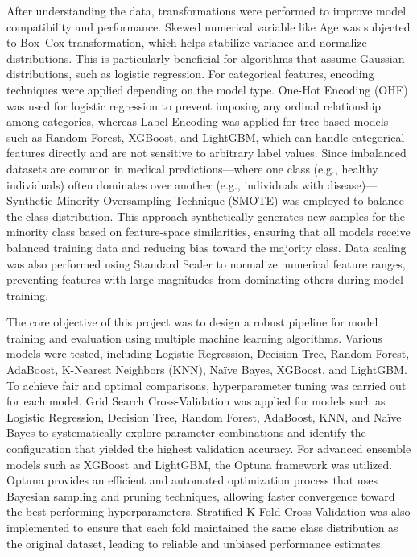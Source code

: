 After understanding the data, transformations were performed to improve model compatibility and performance.
Skewed numerical variable like Age was subjected to Box–Cox transformation, which helps stabilize variance and normalize distributions.
This is particularly beneficial for algorithms that assume Gaussian distributions, such as logistic regression.
For categorical features, encoding techniques were applied depending on the model type.
One-Hot Encoding (OHE) was used for logistic regression to prevent imposing any ordinal relationship among categories, whereas Label Encoding was applied for tree-based models such as Random Forest, XGBoost, and LightGBM, which can handle categorical features directly and are not sensitive to arbitrary label values.
Since imbalanced datasets are common in medical predictions—where one class (e.g., healthy individuals) often dominates over another (e.g., individuals with disease)— Synthetic Minority Oversampling Technique (SMOTE) was employed to balance the class distribution.
This approach synthetically generates new samples for the minority class based on feature-space similarities, ensuring that all models receive balanced training data and reducing bias toward the majority class.
Data scaling was also performed using Standard Scaler to normalize numerical feature ranges, preventing features with large magnitudes from dominating others during model training.

The core objective of this project was to design a robust pipeline for model training and evaluation using multiple machine learning algorithms.
Various models were tested, including Logistic Regression, Decision Tree, Random Forest, AdaBoost, K-Nearest Neighbors (KNN), Naïve Bayes, XGBoost, and LightGBM. To achieve fair and optimal comparisons, hyperparameter tuning was carried out for each model.
Grid Search Cross-Validation was applied for models such as Logistic Regression, Decision Tree, Random Forest, AdaBoost, KNN, and Naïve Bayes to systematically explore parameter combinations and identify the configuration that yielded the highest validation accuracy.
For advanced ensemble models such as XGBoost and LightGBM, the Optuna framework was utilized.
Optuna provides an efficient and automated optimization process that uses Bayesian sampling and pruning techniques, allowing faster convergence toward the best-performing hyperparameters.
Stratified K-Fold Cross-Validation was also implemented to ensure that each fold maintained the same class distribution as the original dataset, leading to reliable and unbiased performance estimates.

